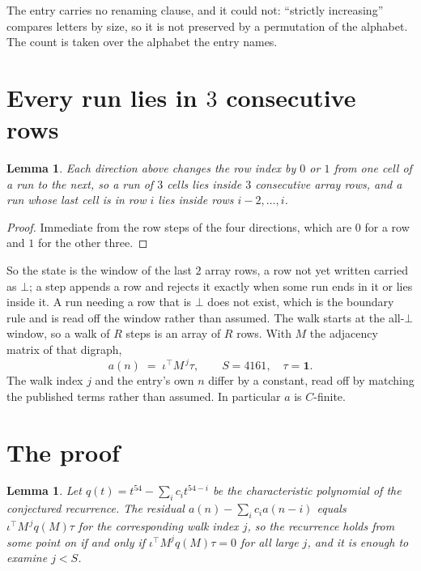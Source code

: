 \documentclass[11pt,a4paper]{article}
\theoremstyle{plain}
\newtheorem{lemma}[theorem]{Lemma}
\theoremstyle{definition}
\begin{document}
The entry carries no renaming clause, and it could not: ``strictly increasing'' compares
letters by size, so it is not preserved by a permutation of the alphabet. The count is taken
over the alphabet the entry names.

\section{Every run lies in $3$ consecutive rows}

\begin{lemma}\label{lem:win}
Each direction above changes the row index by $0$ or $1$ from one cell of a run to the next, so
a run of $3$ cells lies inside $3$ consecutive array rows, and a run whose last cell is in
row $i$ lies inside rows $i-2,\dots,i$.
\end{lemma}

\begin{proof}
Immediate from the row steps of the four directions, which are $0$ for a row and $1$ for the
other three.
\end{proof}

So the state is the window of the last $2$ array rows, a row not yet written carried as
$\bot$; a step appends a row and rejects it exactly when some run ends in it or lies inside it.
A run needing a row that is $\bot$ does not exist, which is the boundary rule and is read off
the window rather than assumed. The walk starts at the all-$\bot$ window, so a walk of $R$ steps
is an array of $R$ rows. With $M$ the adjacency matrix of that digraph,
\[
a(n)\;=\;\iota^{\!\top}M^{\,j}\tau ,\qquad S=4161,\quad\tau=\mathbf{1} .
\]
The walk index $j$ and the entry's own $n$ differ by a constant, read off by matching the
published terms rather than assumed. In particular $a$ is $C$-finite.

\section{The proof}

\begin{lemma}\label{lem:crit}
Let $q(t)=t^{54}-\sum_i c_it^{54-i}$ be the characteristic polynomial of the
conjectured recurrence. The residual $a(n)-\sum_ic_ia(n-i)$ equals
$\iota^{\!\top}M^{\,j}q(M)\tau$ for the corresponding walk index $j$, so the recurrence
holds from some point on if and only if $\iota^{\!\top}M^{j}q(M)\tau=0$ for all large $j$,
and it is enough to examine $j<S$.
\end{lemma}
\end{document}
